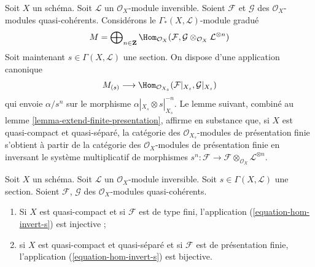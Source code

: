 \noindent
Soit $X$ un schéma. Soit $\mathcal{L}$ un $\mathcal{O}_X$-module inversible.
Soient $\mathcal{F}$ et $\mathcal{G}$ des $\mathcal{O}_X$-modules quasi-cohérents.
Considérons le $\Gamma_*(X, \mathcal{L})$-module gradué
$$
M = \bigoplus\nolimits_{n \in \mathbf{Z}} \Hom_{\mathcal{O}_X}(\mathcal{F},
\mathcal{G} \otimes_{\mathcal{O}_X} \mathcal{L}^{\otimes n})
$$
Soit maintenant $s \in \Gamma(X, \mathcal{L})$ une section. On dispose d'une
application canonique
\begin{equation}
\label{equation-hom-invert-s}
M_{(s)} \longrightarrow
\Hom_{\mathcal{O}_{X_s}}(\mathcal{F}|_{X_s}, \mathcal{G}|_{X_s})
\end{equation}
qui envoie $\alpha/s^n$ sur le morphisme $\alpha|_{X_s} \otimes s|_{X_s}^{-n}$.
Le lemme suivant, combiné au
lemme \ref{lemma-extend-finite-presentation},
affirme en substance que, si $X$ est quasi-compact et quasi-séparé,
la catégorie des $\mathcal{O}_{X_s}$-modules de présentation finie
s'obtient à partir de la catégorie des $\mathcal{O}_X$-modules de présentation finie
en inversant le système multiplicatif de morphismes
$s^n: \mathcal{F} \to
\mathcal{F} \otimes_{\mathcal{O}_X} \mathcal{L}^{\otimes n}$.

\begin{lemma}
\label{lemma-section-maps-backwards}
Soit $X$ un schéma. Soit $\mathcal{L}$ un $\mathcal{O}_X$-module inversible.
Soit $s \in \Gamma(X, \mathcal{L})$ une section.
Soient $\mathcal{F}$, $\mathcal{G}$ des $\mathcal{O}_X$-modules quasi-cohérents.
\begin{enumerate}
\item Si $X$ est quasi-compact et si $\mathcal{F}$ est de type fini,
l'application (\ref{equation-hom-invert-s}) est injective ;
\item si $X$ est quasi-compact et quasi-séparé et si $\mathcal{F}$
est de présentation finie, l'application
(\ref{equation-hom-invert-s})
est bijective.
\end{enumerate}
\end{lemma}

